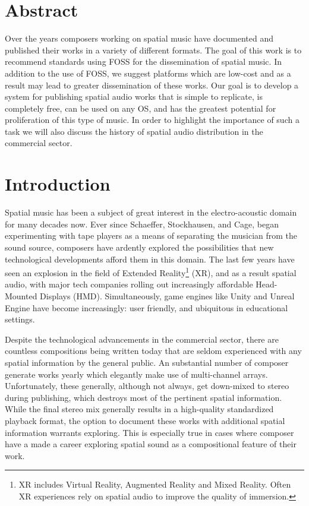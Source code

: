     
\section{Abstract}

Over the years composers working on spatial music have documented and published their works in a variety of different formats. The goal of this work is to recommend standards using FOSS for the dissemination of spatial music. In addition to the use of FOSS, we suggest platforms which are low-cost and as a result may lead to greater dissemination of these works. Our goal is to develop a system for publishing spatial audio works that is simple to replicate, is completely free, can be used on any OS, and has the greatest potential for proliferation of this type of music. In order to highlight the importance of such a task we will also discuss the history of spatial audio distribution in the commercial sector. 

\section{Introduction}

Spatial music has been a subject of great interest in the electro-acoustic domain for many decades now. Ever since Schaeffer, Stockhausen, and Cage, began experimenting with tape players as a means of separating the musician from the sound source, composers have ardently explored the possibilities that new technological developments afford them in this domain. The last few years have seen an explosion in the field of Extended Reality\footnote{XR includes Virtual Reality, Augmented Reality and Mixed Reality. Often XR experiences rely on spatial audio to improve the quality of immersion.} (XR), and as a result spatial audio, with major tech companies rolling out increasingly affordable Head-Mounted Displays (HMD). Simultaneously, game engines like Unity and Unreal Engine have become increasingly: user friendly, and ubiquitous in educational settings. 

Despite the technological advancements in the commercial sector, there are countless compositions being written today that are seldom experienced with any spatial information by the general public. An substantial number of composer generate works yearly which elegantly make use of multi-channel arrays. Unfortunately, these generally, although not always, get down-mixed to stereo during publishing, which destroys most of the pertinent spatial information. While the final stereo mix generally results in a high-quality standardized playback format, the option to document these works with additional spatial information warrants exploring. This is especially true in cases where composer have a made a career exploring spatial sound as a compositional feature of their work.

